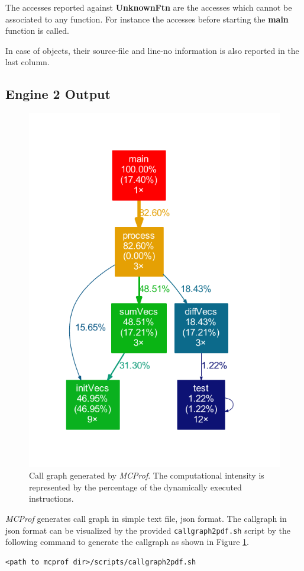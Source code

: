 \documentclass[10pt]{article}
\newcommand{\MCPROF}{\emph{MCProf}}
\begin{document}
The accesses reported against \textbf{UnknownFtn} are the accesses which cannot
be associated to any function. For instance the accesses before starting the
\textbf{main} function is called.

In case of objects, their source-file and line-no information is also reported in
the last column.

\subsection{Engine 2 Output}

\begin{figure}[!h]
\centering
\includegraphics[width=0.75\linewidth]{figures/callgraph.pdf}
\caption{Call graph generated by \MCPROF{}. The computational intensity is
    represented by the percentage of the dynamically executed instructions.}
\label{fig:callgraph}
\end{figure}

\MCPROF{} generates call graph in simple text file, json format. The callgraph
in json format can be visualized by the provided \verb|callgraph2pdf.sh| script
by the following command to generate the callgraph as shown in
Figure \ref{fig:callgraph}.

{
\small
\begin{Verbatim}[frame=single]
<path to mcprof dir>/scripts/callgraph2pdf.sh
\end{Verbatim}
}
\end{document}
